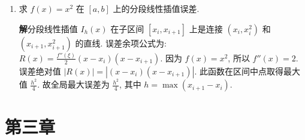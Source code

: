 \documentclass[a4paper,11pt]{ctexart}
\newcommand{\sol}{\par\noindent\textbf{解}\quad}
\begin{document}
\begin{enumerate}[label=\textbf{2-\arabic*.}, leftmargin=*]
    \item[18.] 求 $f(x) = x^2$ 在 $[a, b]$ 上的分段线性插值误差.
    
    \sol 分段线性插值 $I_h(x)$ 在子区间 $[x_i, x_{i+1}]$ 上是连接 $(x_i, x_i^2)$ 和 $(x_{i+1}, x_{i+1}^2)$ 的直线.
    误差余项公式为: $R(x) = \frac{f''(\xi)}{2}(x-x_i)(x-x_{i+1})$.
    因为 $f(x)=x^2$, 所以 $f''(x)=2$.
    误差绝对值 $|R(x)| = |(x-x_i)(x-x_{i+1})|$.
    此函数在区间中点取得最大值 $\frac{h^2}{4}$.
    故全局最大误差为 $\frac{h^2}{4}$, 其中 $h = \max(x_{i+1}-x_i)$.
\end{enumerate}

\section*{第三章}
\end{document}
